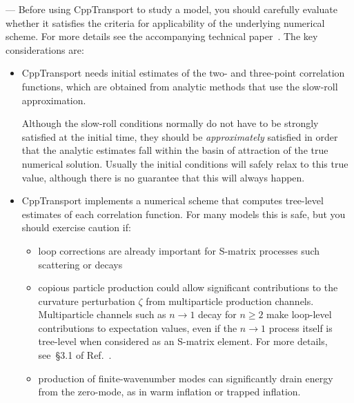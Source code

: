\documentclass[11pt,a4paper]{article}
\newenvironment{warning}{\begin{tcolorbox}[enhanced,breakable,colback=red!10,colbacktitle=red!20,colframe=red!40,coltitle=black,title={Warning},fonttitle=\sffamily\fontseries{b}\selectfont]}{\end{tcolorbox}}
\newcommand{\packagefont}{\sffamily}
\newcommand{\CppTransport}{{\packagefont CppTransport}}
\newcommand{\semibold}[1]{{\fontseries{b}\selectfont{#1}}}
\renewcommand{\geq}{\geqslant}
\begin{document}
\begin{warning}
    \noindent
    \semibold{Will {\CppTransport} work for my model?}---%
    Before using {\CppTransport} to study a model, you should
    carefully evaluate whether it satisfies the criteria for
    applicability of the underlying numerical scheme.
    For more details see the accompanying technical paper~\cite{DiasFrazerMulryneSeery}.
    The key considerations are:
    \begin{itemize}
        \item \semibold{Is it possible to find an initial time
        at which the slow-roll conditions approximately apply?}
        {\CppTransport} needs initial estimates of the two- and three-point
        correlation functions, which are obtained from analytic methods
        that use the slow-roll approximation.

        Although the slow-roll conditions normally do not have to be strongly satisfied
        at the initial time, they should be \emph{approximately} satisfied in order
        that the analytic estimates fall within the basin of attraction of the true
        numerical solution. Usually the initial conditions will safely relax
        to this true value, although there is no guarantee that this will always happen.
        
        \item \semibold{Does the tree approximation apply?}
        {\CppTransport} implements a numerical scheme that computes tree-level
        estimates of each correlation function. For many models this is safe,
        but you should exercise caution if:
        \begin{itemize}
            \item loop corrections are already important for S-matrix processes such
            scattering or decays
            \item copious particle production could allow significant contributions to
            the curvature perturbation $\zeta$ from multiparticle production channels.
            Multiparticle channels such as $n \rightarrow 1$ decay for $n \geq 2$
            make loop-level contributions to expectation values, even if the
            $n \rightarrow 1$ process itself is tree-level when considered as
            an S-matrix element.
            For more details, see~{\S}3.1 of Ref.~\cite{DiasFrazerMulryneSeery}.
            \item production of finite-wavenumber modes can significantly drain energy
            from the zero-mode, as in warm inflation or trapped inflation.
        \end{itemize}
    \end{itemize}
\end{warning}
\end{document}
